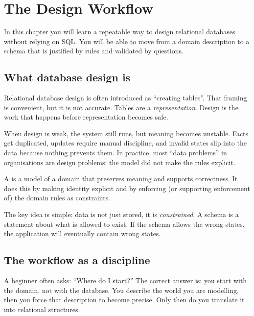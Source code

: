 \chapter{The Design Workflow}

\begin{learningobjectives}
In this chapter you will learn a repeatable way to design relational databases without relying on SQL.
You will be able to move from a domain description to a schema that is justified by rules and validated by questions.
\end{learningobjectives}

\section{What database design is}
Relational database design is often introduced as “creating tables”. That framing is convenient, but it is not accurate.
Tables are a \emph{representation}. Design is the work that happens before representation becomes safe.

When design is weak, the system still runs, but meaning becomes unstable.
Facts get duplicated, updates require manual discipline, and invalid states slip into the data because nothing prevents them.
In practice, most “data problems” in organisations are design problems: the model did not make the rules explicit.

\begin{definitionbox}
A  is a model of a domain that preserves meaning and supports correctness.
It does this by making identity explicit and by enforcing (or supporting enforcement of) the domain rules as constraints.
\end{definitionbox}

The key idea is simple: data is not just stored, it is \emph{constrained}.
A schema is a statement about what is allowed to exist.
If the schema allows the wrong states, the application will eventually contain wrong states.

\section{The workflow as a discipline}
A beginner often asks: “Where do I start?” The correct answer is: you start with the domain, not with the database.
You describe the world you are modelling, then you force that description to become precise.
Only then do you translate it into relational structures.

